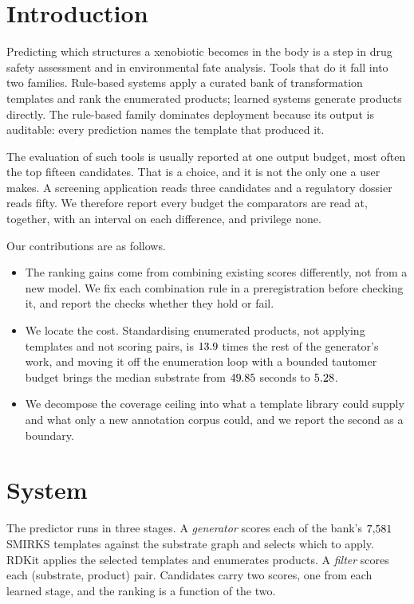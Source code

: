 \documentclass[11pt]{article}
\begin{document}
\section{Introduction}

Predicting which structures a xenobiotic becomes in the body is a step in drug safety assessment
and in environmental fate analysis. Tools that do it fall into two families. Rule-based systems
apply a curated bank of transformation templates and rank the enumerated products; learned systems
generate products directly. The rule-based family dominates deployment because its output is
auditable: every prediction names the template that produced it.

The evaluation of such tools is usually reported at one output budget, most often the top fifteen
candidates. That is a choice, and it is not the only one a user makes. A screening application
reads three candidates and a regulatory dossier reads fifty. We therefore report every budget the
comparators are read at, together, with an interval on each difference, and privilege none.

Our contributions are as follows.

\begin{itemize}
\item The ranking gains come from combining existing scores differently, not from a new model. We
  fix each combination rule in a preregistration before checking it, and report the checks whether
  they hold or fail.
\item We locate the cost. Standardising enumerated products, not applying templates and not
  scoring pairs, is $13.9$ times the rest of the generator's work, and moving
  it off the enumeration loop with a bounded tautomer budget brings the median substrate from
  $49.85$ seconds to $5.28$.
\item We decompose the coverage ceiling into what a template library could supply and what only a
  new annotation corpus could, and we report the second as a boundary.
\end{itemize}

\section{System}

The predictor runs in three stages. A \emph{generator} scores each of the bank's
$7{,}581$ SMIRKS templates against the substrate graph and selects which to apply. RDKit
applies the selected templates and enumerates products. A \emph{filter} scores each
(substrate, product) pair. Candidates carry two scores, one from each learned stage, and the
ranking is a function of the two.
\end{document}
